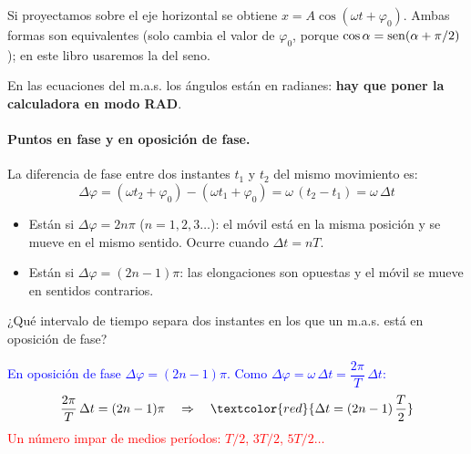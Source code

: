 Si proyectamos sobre el eje horizontal se obtiene \(x = A\cos(\omega t + \varphi_0)\). Ambas formas son equivalentes (solo
cambia el valor de \(\varphi_0\), porque \(\cos\alpha = \operatorname{sen}(\alpha + \pi/2)\)); en este libro usaremos la del seno.

\begin{remark}
    En las ecuaciones del m.a.s. los ángulos están en radianes: \textbf{hay que poner la calculadora en modo RAD}.
\end{remark}

\paragraph{Puntos en fase y en oposición de fase.} La diferencia de fase entre dos instantes \(t_1\) y \(t_2\) del mismo
movimiento es:
\begin{equation*}
    \Delta\varphi = (\omega t_2 + \varphi_0) - (\omega t_1 + \varphi_0) = \omega\,(t_2 - t_1) = \omega\,\Delta t
\end{equation*}
\begin{itemize}
    \item Están  si \(\Delta\varphi = 2n\pi\) (\(n = 1, 2, 3\ldots\)): el móvil está en la misma posición y se
    mueve en el mismo sentido. Ocurre cuando \(\Delta t = nT\).
    \item Están  si \(\Delta\varphi = (2n-1)\pi\): las elongaciones son opuestas y el móvil se
    mueve en sentidos contrarios.
\end{itemize}

\begin{exercise}
    ¿Qué intervalo de tiempo separa dos instantes en los que un m.a.s. está en oposición de fase?
    \begin{solu}
        \textcolor{blue}{En oposición de fase \(\Delta\varphi = (2n-1)\pi\). Como \(\Delta\varphi = \omega\,\Delta t = \dfrac{2\pi}{T}\,\Delta t\):}
        \[ \dfrac{2\pi}{T}\,\Delta t = (2n-1)\pi \quad\Rightarrow\quad \textcolor{red}{\Delta t = (2n-1)\,\dfrac{T}{2}} \]
        \textcolor{red}{Un número impar de medios períodos: \(T/2\), \(3T/2\), \(5T/2\ldots\)}
    \end{solu}
\end{exercise}

